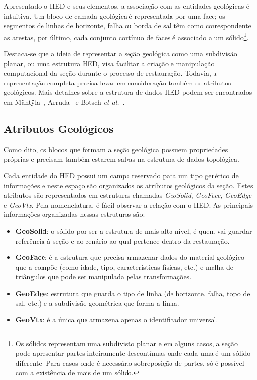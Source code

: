 Apresentado o HED e seus elementos, a associação com as entidades geológicas é intuitiva. Um bloco de camada geológica é representada por uma face; os segmentos de linhas de horizonte, falha ou borda de sal têm como correspondente as arestas, por último, cada conjunto contínuo de faces é associado a um sólido\footnote{Os sólidos representam uma subdivisão planar e em alguns casos, a seção pode apresentar partes inteiramente descontínuas onde cada uma é um sólido diferente. Para casos onde é necessário sobreposição de partes, só é possível com a existência de mais de um sólido.}.

Destaca-se que a ideia de representar a seção geológica como uma subdivisão planar, ou uma estrutura HED, visa facilitar a criação e manipulação computacional da seção durante o processo de restauração. Todavia, a representação completa precisa levar em consideração também os atributos geológicos. Mais detalhes sobre a estrutura de dados HED podem ser encontrados em Mäntÿla~\cite{HED}, Arruda~\cite{Arruda} e Botsch \textit{et al.}~\cite{Botsch}.

\subsection{Atributos Geológicos}

Como dito, os blocos que formam a seção geológica possuem propriedades próprias e precisam também estarem salvas na estrutura de dados topológica.

Cada entidade do HED possui um campo reservado para um tipo genérico de informações e neste espaço são organizados os atributos geológicos da seção. Estes atributos são representados em estruturas chamadas \textit{GeoSolid}, \textit{GeoFace}, \textit{GeoEdge} e \textit{GeoVtx}. Pela nomenclatura, é fácil observar a relação com o HED. As principais informações organizadas nessas estruturas são:

\renewcommand{\labelitemi}{•}
\begin{itemize}
  \item \textbf{GeoSolid}: o sólido por ser a estrutura de mais alto nível, é quem vai guardar referência à seção e ao cenário ao qual pertence dentro da restauração.
  \item \textbf{GeoFace}: é a estrutura que precisa armazenar dados do material geológico que a compõe (como idade, tipo, características físicas, etc.) e malha de triângulos que pode ser manipulada pelas transformações.
  \item \textbf{GeoEdge}: estrutura que guarda o tipo de linha (de horizonte, falha, topo de sal, etc.) e a subdivisão geométrica que forma a linha. 
  \item \textbf{GeoVtx}: é a única que armazena apenas o identificador universal.
\end{itemize}

